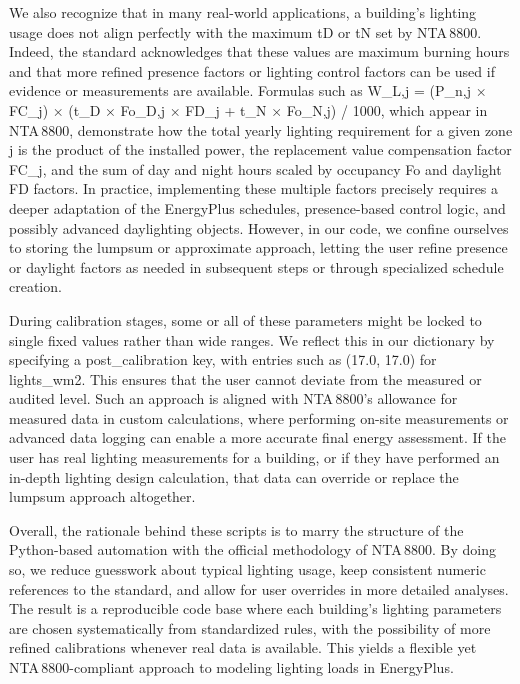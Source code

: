 We also recognize that in many real-world applications, a building’s lighting usage does not align perfectly with the maximum tD or tN set by NTA 8800. Indeed, the standard acknowledges that these values are maximum burning hours and that more refined presence factors or lighting control factors can be used if evidence or measurements are available. Formulas such as W_{L,j} = (P_{n,j} × FC_j) × (t_D × Fo_{D,j} × FD_j + t_N × Fo_{N,j}) / 1000, which appear in NTA 8800, demonstrate how the total yearly lighting requirement for a given zone j is the product of the installed power, the replacement value compensation factor FC_j, and the sum of day and night hours scaled by occupancy Fo and daylight FD factors. In practice, implementing these multiple factors precisely requires a deeper adaptation of the EnergyPlus schedules, presence-based control logic, and possibly advanced daylighting objects. However, in our code, we confine ourselves to storing the lumpsum or approximate approach, letting the user refine presence or daylight factors as needed in subsequent steps or through specialized schedule creation.

During calibration stages, some or all of these parameters might be locked to single fixed values rather than wide ranges. We reflect this in our dictionary by specifying a post_calibration key, with entries such as (17.0, 17.0) for lights_wm2. This ensures that the user cannot deviate from the measured or audited level. Such an approach is aligned with NTA 8800’s allowance for measured data in custom calculations, where performing on-site measurements or advanced data logging can enable a more accurate final energy assessment. If the user has real lighting measurements for a building, or if they have performed an in-depth lighting design calculation, that data can override or replace the lumpsum approach altogether.

Overall, the rationale behind these scripts is to marry the structure of the Python-based automation with the official methodology of NTA 8800. By doing so, we reduce guesswork about typical lighting usage, keep consistent numeric references to the standard, and allow for user overrides in more detailed analyses. The result is a reproducible code base where each building’s lighting parameters are chosen systematically from standardized rules, with the possibility of more refined calibrations whenever real data is available. This yields a flexible yet NTA 8800-compliant approach to modeling lighting loads in EnergyPlus.